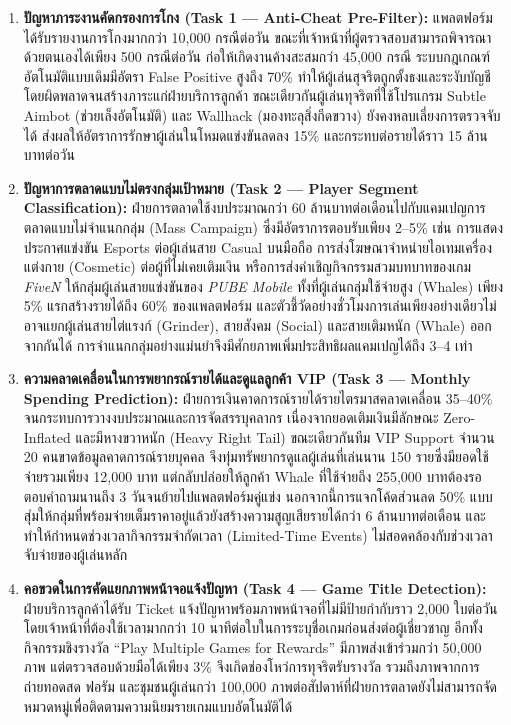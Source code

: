 \documentclass[11pt,a4paper]{article}
\begin{document}
\begin{enumerate}[leftmargin=1.9em,itemsep=2.5pt]
    \item \textbf{ปัญหาภาระงานคัดกรองการโกง (Task 1 — Anti-Cheat Pre-Filter):} แพลตฟอร์มได้รับรายงานการโกงมากกว่า 10,000 กรณีต่อวัน ขณะที่เจ้าหน้าที่ผู้ตรวจสอบสามารถพิจารณาด้วยตนเองได้เพียง 500 กรณีต่อวัน ก่อให้เกิดงานค้างสะสมกว่า 45,000 กรณี ระบบกฎเกณฑ์อัตโนมัติแบบเดิมมีอัตรา False Positive สูงถึง 70\% ทำให้ผู้เล่นสุจริตถูกตั้งธงและระงับบัญชีโดยผิดพลาดจนสร้างภาระแก่ฝ่ายบริการลูกค้า ขณะเดียวกันผู้เล่นทุจริตที่ใช้โปรแกรม Subtle Aimbot (ช่วยเล็งอัตโนมัติ) และ Wallhack (มองทะลุสิ่งกีดขวาง) ยังคงหลบเลี่ยงการตรวจจับได้ ส่งผลให้อัตราการรักษาผู้เล่นในโหมดแข่งขันลดลง 15\% และกระทบต่อรายได้ราว 15 ล้านบาทต่อวัน
    \item \textbf{ปัญหาการตลาดแบบไม่ตรงกลุ่มเป้าหมาย (Task 2 — Player Segment Classification):} ฝ่ายการตลาดใช้งบประมาณกว่า 60 ล้านบาทต่อเดือนไปกับแคมเปญการตลาดแบบไม่จำแนกกลุ่ม (Mass Campaign) ซึ่งมีอัตราการตอบรับเพียง 2--5\% เช่น การแสดงประกาศแข่งขัน Esports ต่อผู้เล่นสาย Casual บนมือถือ การส่งโฆษณาจำหน่ายไอเทมเครื่องแต่งกาย (Cosmetic) ต่อผู้ที่ไม่เคยเติมเงิน หรือการส่งคำเชิญกิจกรรมสวมบทบาทของเกม \textit{FiveN} ให้กลุ่มผู้เล่นสายแข่งขันของ \textit{PUBE Mobile} ทั้งที่ผู้เล่นกลุ่มใช้จ่ายสูง (Whales) เพียง 5\% แรกสร้างรายได้ถึง 60\% ของแพลตฟอร์ม และตัวชี้วัดอย่างชั่วโมงการเล่นเพียงอย่างเดียวไม่อาจแยกผู้เล่นสายไต่แรงก์ (Grinder), สายสังคม (Social) และสายเติมหนัก (Whale) ออกจากกันได้ การจำแนกกลุ่มอย่างแม่นยำจึงมีศักยภาพเพิ่มประสิทธิผลแคมเปญได้ถึง 3--4 เท่า
    \item \textbf{ความคลาดเคลื่อนในการพยากรณ์รายได้และดูแลลูกค้า VIP (Task 3 — Monthly Spending Prediction):} ฝ่ายการเงินคาดการณ์รายได้รายไตรมาสคลาดเคลื่อน 35--40\% จนกระทบการวางงบประมาณและการจัดสรรบุคลากร เนื่องจากยอดเติมเงินมีลักษณะ Zero-Inflated และมีหางขวาหนัก (Heavy Right Tail) ขณะเดียวกันทีม VIP Support จำนวน 20 คนขาดข้อมูลคาดการณ์รายบุคคล จึงทุ่มทรัพยากรดูแลผู้เล่นที่เล่นนาน 150 รายซึ่งมียอดใช้จ่ายรวมเพียง 12,000 บาท แต่กลับปล่อยให้ลูกค้า Whale ที่ใช้จ่ายถึง 255,000 บาทต้องรอตอบคำถามนานถึง 3 วันจนย้ายไปแพลตฟอร์มคู่แข่ง นอกจากนี้การแจกโค้ดส่วนลด 50\% แบบสุ่มให้กลุ่มที่พร้อมจ่ายเต็มราคาอยู่แล้วยังสร้างความสูญเสียรายได้กว่า 6 ล้านบาทต่อเดือน และทำให้กำหนดช่วงเวลากิจกรรมจำกัดเวลา (Limited-Time Events) ไม่สอดคล้องกับช่วงเวลาจับจ่ายของผู้เล่นหลัก
    \item \textbf{คอขวดในการคัดแยกภาพหน้าจอแจ้งปัญหา (Task 4 — Game Title Detection):} ฝ่ายบริการลูกค้าได้รับ Ticket แจ้งปัญหาพร้อมภาพหน้าจอที่ไม่มีป้ายกำกับราว 2,000 ใบต่อวัน โดยเจ้าหน้าที่ต้องใช้เวลามากกว่า 10 นาทีต่อใบในการระบุชื่อเกมก่อนส่งต่อผู้เชี่ยวชาญ อีกทั้งกิจกรรมชิงรางวัล ``Play Multiple Games for Rewards'' มีภาพส่งเข้าร่วมกว่า 50,000 ภาพ แต่ตรวจสอบด้วยมือได้เพียง 3\% จึงเกิดช่องโหว่การทุจริตรับรางวัล รวมถึงภาพจากการถ่ายทอดสด ฟอรัม และชุมชนผู้เล่นกว่า 100,000 ภาพต่อสัปดาห์ที่ฝ่ายการตลาดยังไม่สามารถจัดหมวดหมู่เพื่อติดตามความนิยมรายเกมแบบอัตโนมัติได้

\end{enumerate}
\end{document}
